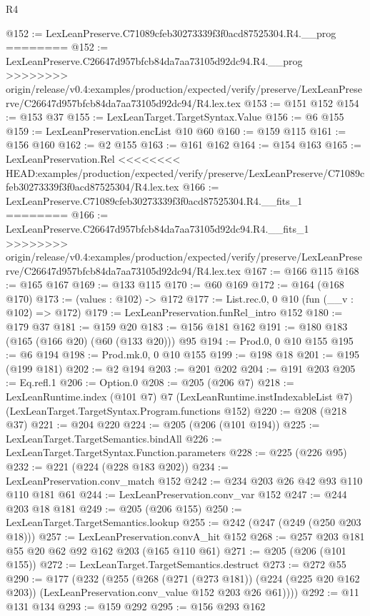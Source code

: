 \begin{lexlean}{R4}
\begin{coremodule}
{{{{{{{{@152 := LexLeanPreserve.C71089cfeb30273339f3f0acd87525304.R4.__prog
========
@152 := LexLeanPreserve.C26647d957bfcb84da7aa73105d92dc94.R4.__prog
>>>>>>>> origin/release/v0.4:examples/production/expected/verify/preserve/LexLeanPreserve/C26647d957bfcb84da7aa73105d92dc94/R4.lex.tex
@153 := @151 @152
@154 := @153 @37
@155 := LexLeanTarget.TargetSyntax.Value
@156 := @6 @155
@159 := LexLeanPreservation.encList @10 @60
@160 := @159 @115
@161 := @156 @160
@162 := @2 @155
@163 := @161 @162
@164 := @154 @163
@165 := LexLeanPreservation.Rel
<<<<<<<< HEAD:examples/production/expected/verify/preserve/LexLeanPreserve/C71089cfeb30273339f3f0acd87525304/R4.lex.tex
@166 := LexLeanPreserve.C71089cfeb30273339f3f0acd87525304.R4.__fits_1
========
@166 := LexLeanPreserve.C26647d957bfcb84da7aa73105d92dc94.R4.__fits_1
>>>>>>>> origin/release/v0.4:examples/production/expected/verify/preserve/LexLeanPreserve/C26647d957bfcb84da7aa73105d92dc94/R4.lex.tex
@167 := @166 @115
@168 := @165 @167
@169 := @133 @115
@170 := @60 @169
@172 := @164 (@168 @170)
@173 := (values : @102) -> @172
@177 := List.rec.{0, 0} @10 (fun (__v : @102) => @172)
@179 := LexLeanPreservation.funRel_intro @152
@180 := @179 @37
@181 := @159 @20
@183 := @156 @181 @162
@191 := @180 @183 (@165 (@166 @20) (@60 (@133 @20))) @95
@194 := Prod.{0, 0} @10 @155
@195 := @6 @194
@198 := Prod.mk.{0, 0} @10 @155
@199 := @198 @18
@201 := @195 (@199 @181)
@202 := @2 @194
@203 := @201 @202
@204 := @191 @203
@205 := Eq.refl.{1}
@206 := Option.{0}
@208 := @205 (@206 @7)
@218 := LexLeanRuntime.index
    (@101 @7)
    @7
    (LexLeanRuntime.instIndexableList @7)
    (LexLeanTarget.TargetSyntax.Program.functions @152)
@220 := @208 (@218 @37)
@221 := @204 @220
@224 := @205 (@206 (@101 @194))
@225 := LexLeanTarget.TargetSemantics.bindAll
@226 := LexLeanTarget.TargetSyntax.Function.parameters
@228 := @225 (@226 @95)
@232 := @221 (@224 (@228 @183 @202))
@234 := LexLeanPreservation.conv_match @152
@242 := @234 @203 @26 @42 @93 @110 @110 @181 @61
@244 := LexLeanPreservation.conv_var @152
@247 := @244 @203 @18 @181
@249 := @205 (@206 @155)
@250 := LexLeanTarget.TargetSemantics.lookup
@255 := @242 (@247 (@249 (@250 @203 @18)))
@257 := LexLeanPreservation.convA_hit @152
@268 := @257 @203 @181 @55 @20 @62 @92 @162 @203 (@165 @110 @61)
@271 := @205 (@206 (@101 @155))
@272 := LexLeanTarget.TargetSemantics.destruct
@273 := @272 @55
@290 := @177
    (@232
      (@255
        (@268
          (@271 (@273 @181))
          (@224 (@225 @20 @162 @203))
          (LexLeanPreservation.conv_value @152 @203 @26 @61))))
@292 := @11 @131 @134
@293 := @159 @292
@295 := @156 @293 @162
}}}}}}}}
\end{coremodule}
\end{lexlean}
